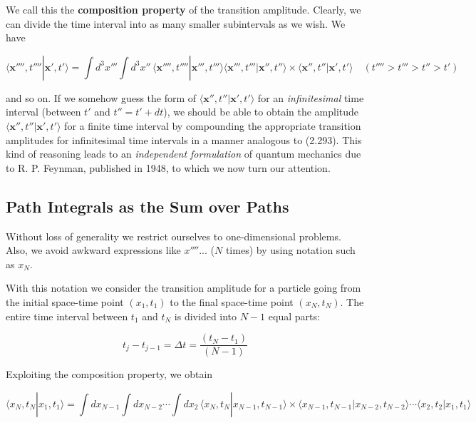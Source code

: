 \documentclass[11pt,a4paper]{article}
\begin{document}
We call this the \textbf{composition property} of the transition amplitude. Clearly, we can divide the time interval into as many smaller subintervals as we wish. We have

\begin{equation}
\langle \mathbf{x}'''', t''''|\mathbf{x}', t'\rangle = \int d^3x'''\int d^3x''\,\langle \mathbf{x}'''', t''''|\mathbf{x}''', t'''\rangle\langle \mathbf{x}''', t'''|\mathbf{x}'', t''\rangle \times \langle \mathbf{x}'', t''|\mathbf{x}', t'\rangle \quad (t'''' > t''' > t'' > t')
\tag{2.293}
\end{equation}

and so on. If we somehow guess the form of $\langle \mathbf{x}'', t''|\mathbf{x}', t'\rangle$ for an \textit{infinitesimal} time interval (between $t'$ and $t'' = t' + dt$), we should be able to obtain the amplitude $\langle \mathbf{x}'', t''|\mathbf{x}', t'\rangle$ for a finite time interval by compounding the appropriate transition amplitudes for infinitesimal time intervals in a manner analogous to (2.293). This kind of reasoning leads to an \textit{independent formulation} of quantum mechanics due to R. P. Feynman, published in 1948, to which we now turn our attention.

\subsection{Path Integrals as the Sum over Paths}

Without loss of generality we restrict ourselves to one-dimensional problems. Also, we avoid awkward expressions like $x''''...$ ($N$ times) by using notation such as $x_N$.

With this notation we consider the transition amplitude for a particle going from the initial space-time point $(x_1, t_1)$ to the final space-time point $(x_N, t_N)$. The entire time interval between $t_1$ and $t_N$ is divided into $N - 1$ equal parts:

\begin{equation}
t_j - t_{j-1} = \Delta t = \frac{(t_N - t_1)}{(N - 1)}
\tag{2.294}
\end{equation}

Exploiting the composition property, we obtain

\begin{equation}
\langle x_N, t_N|x_1, t_1\rangle = \int dx_{N-1}\int dx_{N-2}\cdots\int dx_2\,\langle x_N, t_N|x_{N-1}, t_{N-1}\rangle \times \langle x_{N-1}, t_{N-1}|x_{N-2}, t_{N-2}\rangle\cdots\langle x_2, t_2|x_1, t_1\rangle
\tag{2.295}
\end{equation}
\end{document}
